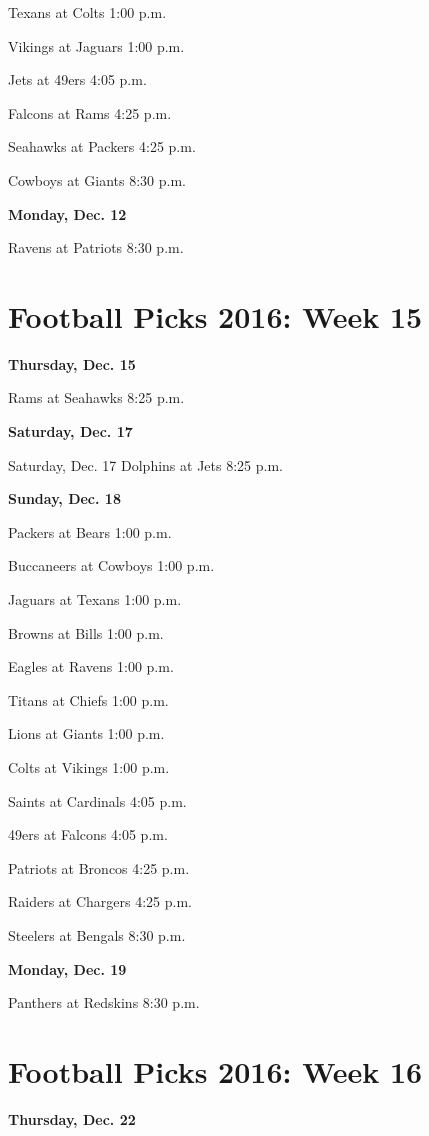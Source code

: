 \documentclass[12pt, letterpaper]{article}
\begin{document}
Texans at Colts 1:00 p.m.\par
Vikings at Jaguars 1:00 p.m.\par
Jets at 49ers 4:05 p.m.\par
Falcons at Rams 4:25 p.m.\par
Seahawks at Packers 4:25 p.m.\par
Cowboys at Giants 8:30 p.m.\par
\noindent \Large \textbf{Monday, Dec. 12} \par
Ravens at Patriots 8:30 p.m.\par
\newpage \section*{\Huge Football Picks 2016: Week 15}
\noindent \Large \textbf{Thursday, Dec. 15} \par
Rams at Seahawks 8:25 p.m.\par
\noindent \Large \textbf{Saturday, Dec. 17} \par
Saturday, Dec. 17
Dolphins at Jets 8:25 p.m.\par
\noindent \Large \textbf{Sunday, Dec. 18} \par
Packers at Bears 1:00 p.m.\par
Buccaneers at Cowboys 1:00 p.m.\par
Jaguars at Texans 1:00 p.m.\par
Browns at Bills 1:00 p.m.\par
Eagles at Ravens 1:00 p.m.\par
Titans at Chiefs 1:00 p.m.\par
Lions at Giants 1:00 p.m.\par
Colts at Vikings 1:00 p.m.\par
Saints at Cardinals 4:05 p.m.\par
49ers at Falcons 4:05 p.m.\par
Patriots at Broncos 4:25 p.m.\par
Raiders at Chargers 4:25 p.m.\par
Steelers at Bengals 8:30 p.m.\par
\noindent \Large \textbf{Monday, Dec. 19} \par
Panthers at Redskins 8:30 p.m.\par
\newpage \section*{\Huge Football Picks 2016: Week 16}
\noindent \Large \textbf{Thursday, Dec. 22} \par
\end{document}
